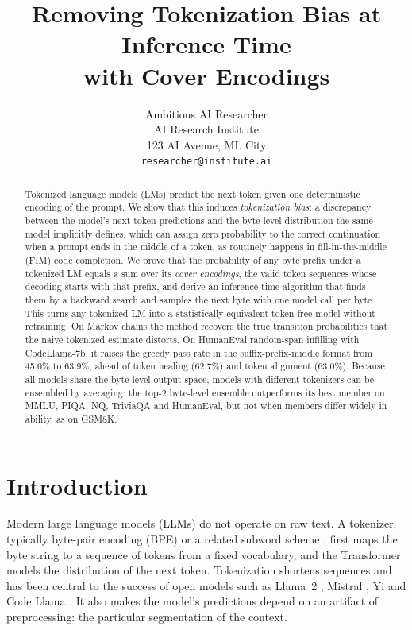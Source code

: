 \documentclass{article} %
\title{Removing Tokenization Bias at Inference Time \\ with Cover Encodings}
\author{Ambitious AI Researcher\\
AI Research Institute\\
123 AI Avenue, ML City\\
\texttt{researcher@institute.ai}
}
\begin{document}
\maketitle

\begin{abstract}
Tokenized language models (LMs) predict the next token given one deterministic encoding of the prompt. We show that this induces \emph{tokenization bias}: a discrepancy between the model's next-token predictions and the byte-level distribution the same model implicitly defines, which can assign zero probability to the correct continuation when a prompt ends in the middle of a token, as routinely happens in fill-in-the-middle (FIM) code completion. We prove that the probability of any byte prefix under a tokenized LM equals a sum over its \emph{cover encodings}, the valid token sequences whose decoding starts with that prefix, and derive an inference-time algorithm that finds them by a backward search and samples the next byte with one model call per byte. This turns any tokenized LM into a statistically equivalent token-free model without retraining. On Markov chains the method recovers the true transition probabilities that the naive tokenized estimate distorts. On HumanEval random-span infilling with CodeLlama-7b, it raises the greedy pass rate in the suffix-prefix-middle format from 45.0\% to 63.9\%, ahead of token healing (62.7\%) and token alignment (63.0\%). Because all models share the byte-level output space, models with different tokenizers can be ensembled by averaging: the top-2 byte-level ensemble outperforms its best member on MMLU, PIQA, NQ, TriviaQA and HumanEval, but not when members differ widely in ability, as on GSM8K.
\end{abstract}

\section{Introduction}
\label{sec:intro}
Modern large language models (LLMs) do not operate on raw text. A tokenizer, typically byte-pair encoding (BPE) \citep{sennrich2016bpe,wang2020bytelevel} or a related subword scheme \citep{kudo2018sentencepiece}, first maps the byte string to a sequence of tokens from a fixed vocabulary, and the Transformer \citep{vaswani2017attention} models the distribution of the next token. Tokenization shortens sequences and has been central to the success of open models such as Llama~2 \citep{touvron2023llama2}, Mistral \citep{jiang2023mistral}, Yi \citep{young2024yi} and Code Llama \citep{roziere2023codellama}. It also makes the model's predictions depend on an artifact of preprocessing: the particular segmentation of the context.
\end{document}
